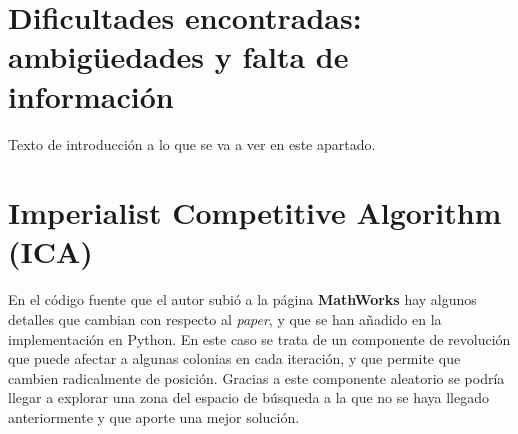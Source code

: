 \section{Dificultades encontradas: ambigüedades y falta de información}

Texto de introducción a lo que se va a ver en este apartado.

\section{Imperialist Competitive Algorithm (ICA)}

En el código fuente que el autor subió a la página \textbf{MathWorks} \cite{ica-matlab} hay algunos detalles que cambian con respecto al \textit{paper}, y que se han añadido en la implementación en Python. En este caso se trata de un componente de revolución que puede afectar a algunas colonias en cada iteración, y que permite que cambien radicalmente de posición. Gracias a este componente aleatorio se podría llegar a explorar una zona del espacio de búsqueda a la que no se haya llegado anteriormente y que aporte una mejor solución.